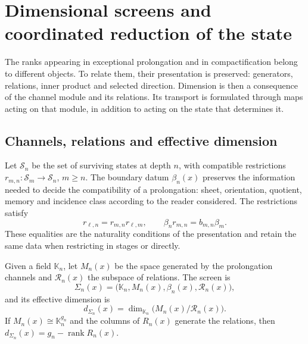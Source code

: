 \section{Dimensional screens and coordinated reduction of the state}
\label{x_reciprocidad:iv:pantallas}

The ranks appearing in exceptional prolongation and in
compactification belong to different objects. To relate them,
their presentation is preserved: generators, relations, inner
product and selected direction. Dimension is then a
consequence of the channel module and its relations. Its
transport is formulated through maps acting on that module,
in addition to acting on the state that determines it.

\subsection{Channels, relations and effective dimension}

Let \(\mathcal S_n\) be the set of surviving states at
depth \(n\), with compatible restrictions
\(r_{m,n}:\mathcal S_m\to\mathcal S_n\), \(m\geq n\).
The boundary datum \(\beta_n(x)\) preserves the information
needed to decide the compatibility of a prolongation:
sheet, orientation, quotient, memory and incidence class according to
the reader considered. The restrictions satisfy
\[
 r_{\ell,n}=r_{m,n}r_{\ell,m},\qquad
 \beta_n r_{m,n}=b_{m,n}\beta_m.
\]
These equalities are the naturality conditions of the
presentation and retain the same data when restricting in
stages or directly.

\begin{definition}
\label{x_reciprocidad:iv:def:pantalla}
Given a field \(\mathbb K_n\), let \(M_n(x)\) be the space
generated by the prolongation channels and \(\mathcal R_n(x)\)
the subspace of relations. The screen is
\[
 \Sigma_n(x)=\bigl(\mathbb K_n,M_n(x),\beta_n(x),
                    \mathcal R_n(x)\bigr),
\]
and its effective dimension is
\begin{equation}
 d_{\Sigma_n}(x)=\dim_{\mathbb K_n}
                    \bigl(M_n(x)/\mathcal R_n(x)\bigr).
 \label{x_reciprocidad:iv:eq:dimension-pantalla}
\end{equation}
If \(M_n(x)\cong\mathbb K_n^{g_n}\) and the columns of
\(R_n(x)\) generate the relations, then
\(d_{\Sigma_n}(x)=g_n-\operatorname{rank}R_n(x)\).
\end{definition}


